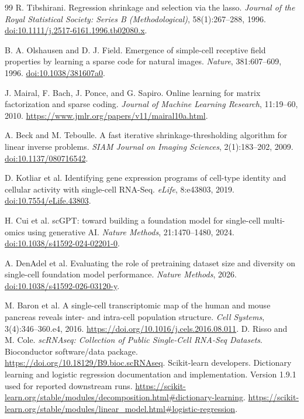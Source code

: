 \begin{thebibliography}{99}
R. Tibshirani.
Regression shrinkage and selection via the lasso.
\emph{Journal of the Royal Statistical Society: Series B (Methodological)}, 58(1):267--288, 1996.
\href{https://doi.org/10.1111/j.2517-6161.1996.tb02080.x}{doi:10.1111/j.2517-6161.1996.tb02080.x}.

B. A. Olshausen and D. J. Field.
Emergence of simple-cell receptive field properties by learning a sparse code for natural images.
\emph{Nature}, 381:607--609, 1996.
\href{https://doi.org/10.1038/381607a0}{doi:10.1038/381607a0}.

J. Mairal, F. Bach, J. Ponce, and G. Sapiro.
Online learning for matrix factorization and sparse coding.
\emph{Journal of Machine Learning Research}, 11:19--60, 2010.
\url{https://www.jmlr.org/papers/v11/mairal10a.html}.

A. Beck and M. Teboulle.
A fast iterative shrinkage-thresholding algorithm for linear inverse problems.
\emph{SIAM Journal on Imaging Sciences}, 2(1):183--202, 2009.
\href{https://doi.org/10.1137/080716542}{doi:10.1137/080716542}.

D. Kotliar et al.
Identifying gene expression programs of cell-type identity and cellular activity with single-cell RNA-Seq.
\emph{eLife}, 8:e43803, 2019.
\href{https://doi.org/10.7554/eLife.43803}{doi:10.7554/eLife.43803}.

H. Cui et al.
scGPT: toward building a foundation model for single-cell multi-omics using generative AI.
\emph{Nature Methods}, 21:1470--1480, 2024.
\href{https://doi.org/10.1038/s41592-024-02201-0}{doi:10.1038/s41592-024-02201-0}.

A. DenAdel et al.
Evaluating the role of pretraining dataset size and diversity on single-cell foundation model performance.
\emph{Nature Methods}, 2026.
\href{https://doi.org/10.1038/s41592-026-03120-y}{doi:10.1038/s41592-026-03120-y}.


 M. Baron et al.
A single-cell transcriptomic map of the human and mouse pancreas reveals
inter- and intra-cell population structure.
\emph{Cell Systems}, 3(4):346--360.e4, 2016.
\url{https://doi.org/10.1016/j.cels.2016.08.011}.
 D. Risso and M. Cole.
\emph{scRNAseq: Collection of Public Single-Cell RNA-Seq Datasets}.
Bioconductor software/data package.
\url{https://doi.org/10.18129/B9.bioc.scRNAseq}.
 Scikit-learn developers.
Dictionary learning and logistic regression documentation and implementation.
Version 1.9.1 used for reported downstream runs.
\url{https://scikit-learn.org/stable/modules/decomposition.html#dictionary-learning}.
\url{https://scikit-learn.org/stable/modules/linear_model.html#logistic-regression}.
\end{thebibliography}
